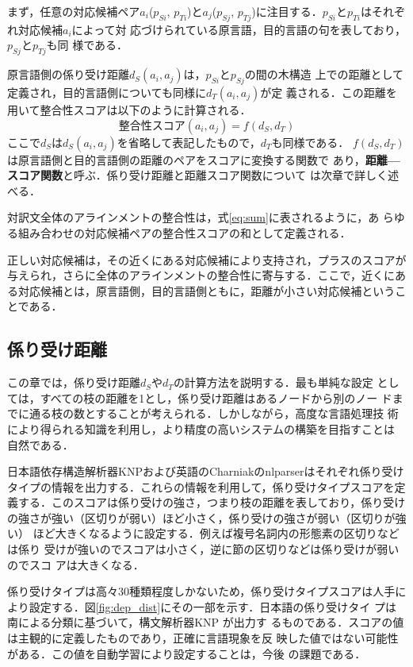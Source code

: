 \documentclass[japanese]{jnlp_1.4}
\begin{document}
まず，任意の対応候補ペア$a_i$($p_{Si}$, $p_{Ti}$)と$a_j$($p_{Sj}$,
$p_{Tj}$)に注目する．$p_{Si}$と$p_{Ti}$はそれぞれ対応候補$a_i$によって対
応づけられている原言語，目的言語の句を表しており，$p_{Sj}$と$p_{Tj}$も同
様である．


原言語側の係り受け距離$d_S(a_i, a_j)$は，$p_{Si}$と$p_{Sj}$の間の木構造
上での距離として定義され，目的言語側についても同様に$d_T(a_i, a_j)$が定
義される．この距離を用いて整合性スコアは以下のように計算される．
\begin{equation}
 整合性スコア(a_i, a_j) = f(d_S, d_T)
\end{equation}
ここで$d_S$は$d_S(a_i, a_j)$を省略して表記したもので，$d_T$も同様である．
$f(d_S, d_T)$は原言語側と目的言語側の距離のペアをスコアに変換する関数で
あり，{\bf 距離—スコア関数}と呼ぶ．係り受け距離と距離スコア関数について
は次章で詳しく述べる．


対訳文全体のアラインメントの整合性は，式\ref{eq:sum}に表されるように，あ
らゆる組み合わせの対応候補ペアの整合性スコアの和として定義される．


正しい対応候補は，その近くにある対応候補により支持され，プラスのスコアが
与えられ，さらに全体のアラインメントの整合性に寄与する．ここで，近くにあ
る対応候補とは，原言語側，目的言語側ともに，距離が小さい対応候補というこ
とである．


\subsection{係り受け距離}

この章では，係り受け距離$d_S$や$d_T$の計算方法を説明する．最も単純な設定
としては，すべての枝の距離を1とし，係り受け距離はあるノードから別のノー
ドまでに通る枝の数とすることが考えられる．しかしながら，高度な言語処理技
術により得られる知識を利用し，より精度の高いシステムの構築を目指すことは
自然である．


日本語依存構造解析器KNPおよび英語のCharniakのnlparserはそれぞれ係り受け
タイプの情報を出力する．これらの情報を利用して，係り受けタイプスコアを定
義する．このスコアは係り受けの強さ，つまり枝の距離を表しており，係り受け
の強さが強い（区切りが弱い）ほど小さく，係り受けの強さが弱い（区切りが強い） 
ほど大きくなるように設定する．例えば複号名詞内の形態素の区切りなどは係り
受けが強いのでスコアは小さく，逆に節の区切りなどは係り受けが弱いのでスコ
アは大きくなる．


係り受けタイプは高々30種類程度しかないため，係り受けタイプスコアは人手に
より設定する．図\ref{fig:dep_dist}にその一部を示す．日本語の係り受けタイ
プは南による分類\cite{Minami}に基づいて，構文解析器KNP \cite{KNP}が出力す
るものである．スコアの値は主観的に定義したものであり，正確に言語現象を反
映した値ではない可能性がある．この値を自動学習により設定することは，今後
の課題である．
\end{document}
